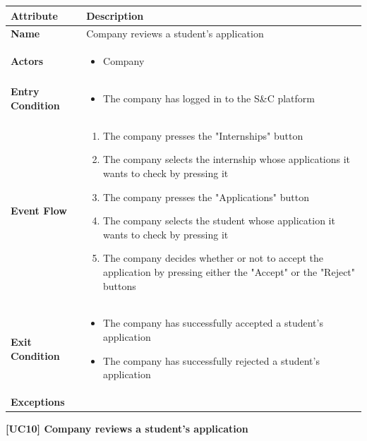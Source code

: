 \begin{center}
    
    \begin{tabular}{|p{3cm}|p{9cm}|}
    \hline
    \textbf{Attribute} & \textbf{Description} \\ \hline
    \textbf{Name} & Company reviews a student's application \\ \hline
    \textbf{Actors} & 
    \begin{itemize}
        \item Company
    \end{itemize} \\ \hline
    \textbf{Entry Condition} & 
    \begin{itemize}
        \item The company has logged in to the S\&C platform
    \end{itemize}\\ \hline
    \textbf{Event Flow} & 
    \begin{enumerate}
        \item The company presses the "Internships" button 
        \item The company selects the internship whose applications it wants to check by pressing it
        \item The company presses the "Applications" button
        \item The company selects the student whose application it wants to check by pressing it
        \item The company decides whether or not to accept the application by pressing either the "Accept" or the "Reject" buttons
    \end{enumerate} \\ \hline
    \textbf{Exit Condition} & 
    \begin{itemize}
        \item The company has successfully accepted a student's application
        \item The company has successfully rejected a student's application
    \end{itemize} \\ \hline
    \textbf{Exceptions} & \\ \hline
    \end{tabular}
    \newline
    \newline
    \textbf{[UC10] Company reviews a student's application}
    \newline
    \newline
    

\end{center}
